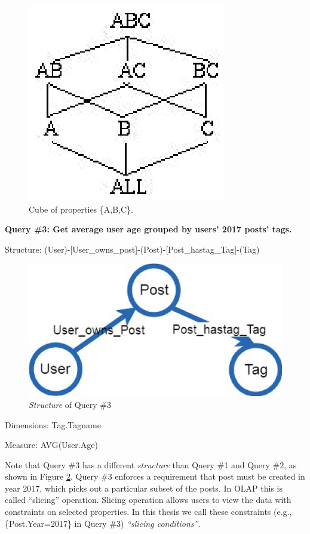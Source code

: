 \begin{figure}[H]
	\centering
	\includegraphics[scale=1]{pic/22.eps}
	\caption{Cube of properties \{A,B,C\}.}
	\label{fig:2:2}
\end{figure}

\textbf{Query \#3: 		Get average user age grouped by users’ 2017 posts’ tags.}

Structure:	(User)-[User\_owns\_post]-(Post)-[Post\_hastag\_Tag]-(Tag)
\begin{figure}[H]
	\centering
	\includegraphics[scale=0.5]{pic/meta2.eps}
	\caption{\textit{Structure} of Query \#3}
	\label{fig:2:3}
\end{figure}


Dimensions:	{Tag.Tagname}

Measure:	{AVG(User.Age)}

Note that Query \#3 has a different \textit{structure} than Query \#1 and Query \#2, as shown in Figure \ref{fig:2:3}. Query \#3 enforces a requirement that post must be created in year 2017, which picks out a particular subset of  the posts. In OLAP this is called ``slicing'' operation. Slicing operation allows users to view the data with constraints on selected properties. In this thesis we call these constraints (e.g., \{Post.Year=2017\} in Query \#3) \textit{``slicing conditions''}.

